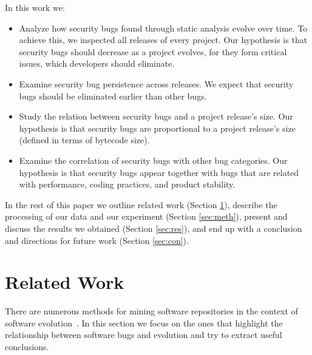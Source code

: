 \documentclass[letterpaper,twocolumn,10pt]{article}
\begin{document}
In this work we:
\begin{itemize}
	\item Analyze how security bugs found through static analysis
evolve over time. To achieve this, we inspected all releases of every project.
Our hypothesis is that security bugs should decrease as a project evolves,
for they form critical issues, which developers should eliminate.
	\item Examine security bug persistence across releases. 
We expect that security bugs should be eliminated earlier than other bugs.
	\item Study the relation between security bugs and a project
release's size. Our hypothesis is that security bugs are proportional to a project
release's size (defined in terms of bytecode size).
	\item Examine the correlation of security bugs with other bug categories.
Our hypothesis is that security bugs appear together with bugs that
are related with performance, coding practices, and product stability.
\end{itemize}

In the rest of this paper we
outline related work (Section \ref{sec:rel}),
describe the processing of our data and our experiment (Section \ref{sec:meth}),
present and discuss the results we obtained (Section \ref{sec:res}),
and end up with a conclusion and directions for future work (Section \ref{sec:con}).

\section{Related Work}
\label{sec:rel}

There are numerous methods for mining software repositories in the context
of software evolution~\cite{KCM07}. In this section we focus on the ones
that highlight the relationship between software bugs and evolution and try to
extract useful conclusions. 
\end{document}
